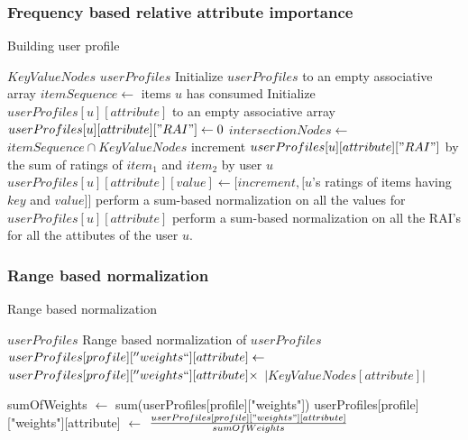\documentclass[11pt]{article}
\begin{document}
\subsubsection{Frequency based relative attribute importance}
\begin{algorithm}
\label{buidinguserprofile_algo}
\caption{Building user profile}
\begin{algorithmic}[1]
\renewcommand{\algorithmicrequire}{\textbf{Input:}}
\renewcommand{\algorithmicensure}{\textbf{Output:}}
\REQUIRE $KeyValueNodes$
\ENSURE  $userProfiles$
\STATE Initialize $userProfiles$ to an empty associative array
  \STATE $itemSequence \leftarrow$ items $u$ has consumed 
    \STATE Initialize $userProfiles[u][attribute]$ to an empty associative array
    \STATE $userProfiles[u][attribute]["RAI"] \leftarrow 0$
      \STATE $intersectionNodes \leftarrow$   $ itemSequence \cap KeyValueNodes$
	\STATE increment $userProfiles[u][attribute]["RAI"]$ by the sum of ratings of $item_1$ and $item_2$ by user $u$
	  $userProfiles[u][attribute][value] \leftarrow [increment, [ u$'s ratings of items having $key$ and $value] ]$
	\ENDIF
      \ENDFOR
    \ENDFOR
    \STATE perform a sum-based normalization on all the values for $userProfiles[u][attribute]$
   \ENDFOR
  \STATE perform a sum-based normalization on all the RAI's for all the attibutes of the user $u$.
\ENDFOR
\end{algorithmic}
\end{algorithm}

\subsubsection{Range based normalization}
\begin{algorithm}
\label{buidingusernormalize_algo}
\caption{Range based normalization}
\begin{algorithmic}[1]
\renewcommand{\algorithmicrequire}{\textbf{Input:}}
\renewcommand{\algorithmicensure}{\textbf{Output:}}
\REQUIRE $userProfiles$
\ENSURE Range based normalization of $userProfiles$ 
\STATE  $userProfiles[profile][''weights``][attribute] \leftarrow$  $userProfiles[profile][''weights``][attribute] \times$ $|KeyValueNodes[attribute]|$
\ENDFOR
\ENDFOR

\STATE sumOfWeights $\leftarrow$ sum(userProfiles[profile]["weights"])
\STATE userProfiles[profile]["weights"][attribute] $\leftarrow$ $\frac{userProfiles[profile]["weights"][attribute]}{sumOfWeights}$
\ENDFOR
\ENDFOR
\end{algorithmic}
\end{algorithm}
\end{document}
